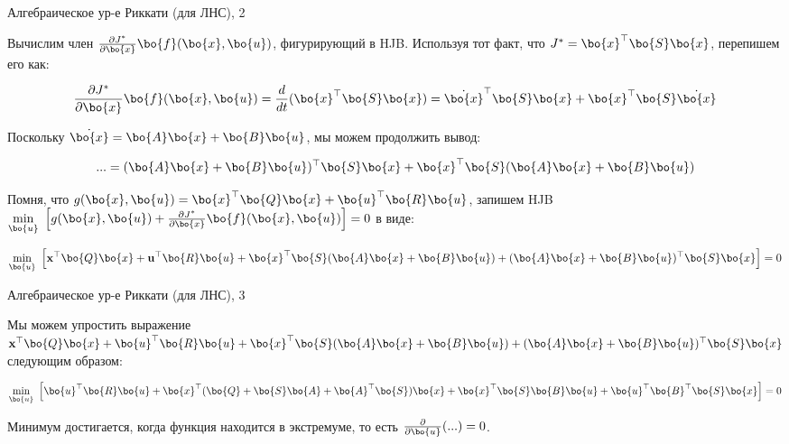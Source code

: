 \documentclass{beamer}
\begin{document}
\begin{frame}{Алгебраическое ур-е Риккати (для ЛНС), 2}
	\begin{flushleft}
		
		Вычислим член $\frac{\partial J^*}{\partial \bo{x}} \bo{f} (\bo{x}, \bo{u})$, фигурирующий в HJB. Используя тот факт, что $J^* =\bo{x}^\top \bo{S} \bo{x}$, перепишем его как:
		
		\begin{equation}
			\frac{\partial J^*}{\partial \bo{x}} \bo{f} (\bo{x}, \bo{u}) = \frac{d}{dt}(\bo{x}^\top \bo{S}\bo{x})
			=
			\dot{\bo{x}}^\top \bo{S}\bo{x} + \bo{x}^\top \bo{S}\dot{\bo{x}} 
		\end{equation}
		
		Поскольку $\dot {\bo{x}} = \bo{A}  \bo{x} + \bo{B} \bo{u}$, мы можем продолжить вывод:
		
		\begin{equation}
			... =
			(\bo{A}  \bo{x} + \bo{B} \bo{u})^\top \bo{S}\bo{x} + \bo{x}^\top \bo{S}(\bo{A}  \bo{x} + \bo{B} \bo{u})
		\end{equation}
		
		
		\bigskip
		
		Помня, что $g(\bo{x}, \bo{u} ) = 
		\bo{x}^\top \bo{Q} \bo{x} +
		\bo{u} ^\top \bo{R} \bo{u}$, запишем HJB $\underset{\bo{u}}{\min} \ 
		\left[ 
		g(\bo{x}, \bo{u}) + 
		\frac{\partial J^*}{\partial \bo{x}} \bo{f} (\bo{x}, \bo{u}) 
		\right] = 0$ в виде:
		
		\[
		\underset{\bo{u}}{\min} \ 
		\left [ 
		\mathbf  x^\top \bo{Q} \bo{x} +
		\mathbf  u^\top \bo{R} \bo{u}
		+ 
		\bo{x}^\top \bo{S}
		(\bo{A} \bo{x} + \bo{B} \bo{u}) 
		+ 
		(\bo{A} \bo{x} + \bo{B} \bo{u})^\top
		\bo{S} \bo{x}
		\right ] = 0
		\]
		
	\end{flushleft}
\end{frame}






\begin{frame}{Алгебраическое ур-е Риккати (для ЛНС), 3}
	\begin{flushleft}
		
		Мы можем упростить выражение $\mathbf  x^\top \bo{Q} \bo{x} +
		\bo{u}^\top \bo{R} \bo{u}
		+ 
		\bo{x}^\top \bo{S}
		(\bo{A} \bo{x} + \bo{B} \bo{u}) 
		+ 
		(\bo{A} \bo{x} + \bo{B} \bo{u})^\top
		\bo{S} \bo{x}$ следующим образом:
		
		
		\[
		\underset{\bo{u}}{\min} \ 
		\left [ 
		\bo{u}^\top \bo{R} \bo{u}
		+ 
		\bo{x}^\top (
		\bo{Q} + \bo{S} \bo{A} + \bo{A}^\top \bo{S}
		)\bo{x}
		+ 
		\bo{x}^\top \bo{S} \bo{B} \bo{u} 
		+ \bo{u}^\top \bo{B}^\top \bo{S} \bo{x} 
		\right ] = 0
		\]
		
		
		\bigskip
		
		Минимум достигается, когда функция находится в экстремуме, то есть $\frac{\partial}{\partial \bo{u}} (...) = 0$.
		
	\end{flushleft}
\end{frame}
\end{document}
